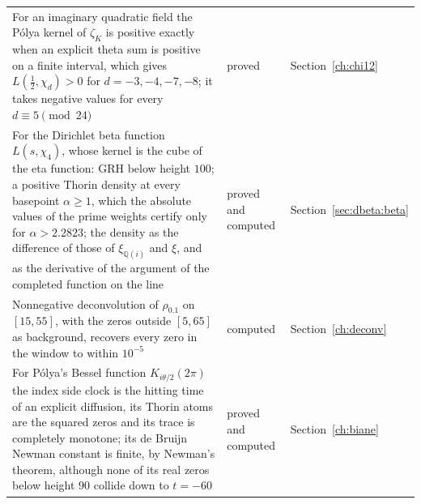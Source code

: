 {\begin{longtable}{p{}p{}p{}}
For an imaginary quadratic field the P\'olya kernel of $\zeta_K$ is positive exactly when an explicit theta sum is positive on a finite interval, which gives $L(\frac12,\chi_d)>0$ for $d=-3,-4,-7,-8$; it takes negative values for every $d\equiv5\pmod{24}$ & \raggedright proved & Section~\ref{ch:chi12}\\
For the Dirichlet beta function $L(s,\chi_4)$, whose kernel is the cube of the eta function: GRH below height $100$; a positive Thorin density at every basepoint $\alpha\ge1$, which the absolute values of the prime weights certify only for $\alpha>2.2823$; the density as the difference of those of $\xi_{\mathbb Q(i)}$ and $\xi$, and as the derivative of the argument of the completed function on the line & \raggedright proved and computed & Section~\ref{sec:dbeta:beta}\\
Nonnegative deconvolution of $\rho_{0.1}$ on $[15,55]$, with the zeros outside $[5,65]$ as background, recovers every zero in the window to within $10^{-5}$ & \raggedright computed & Section~\ref{ch:deconv}\\
For P\'olya's Bessel function $K_{i\theta/2}(2\pi)$ the index side clock is the hitting time of an explicit diffusion, its Thorin atoms are the squared zeros and its trace is completely monotone; its de Bruijn Newman constant is finite, by Newman's theorem, although none of its real zeros below height $90$ collide down to $t=-60$ & \raggedright proved and computed & Section~\ref{ch:biane}\\
\end{longtable}}

